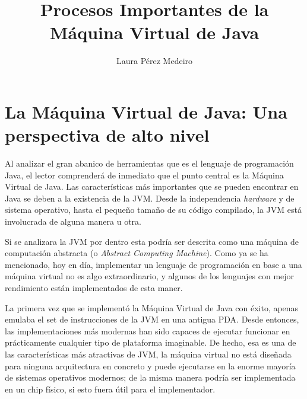 \documentclass[english,runningheads,a4paper]{llncs}[2018/03/10]
\begin{document}
\title{Procesos Importantes de la Máquina Virtual de Java}

\author{Laura Pérez Medeiro}

\maketitle


\section*{La Máquina Virtual de Java: Una perspectiva de alto nivel}
Al analizar el gran abanico de herramientas que es el lenguaje de programación
Java, el lector comprenderá de inmediato que el punto central es la Máquina
Virtual de Java. Las características más importantes que se pueden encontrar en
Java se deben a la existencia de la JVM. Desde la independencia
\textit{hardware} y de sistema operativo, hasta el pequeño tamaño de su código
compilado, la JVM está involucrada de alguna manera u otra.

Si se analizara la JVM por dentro esta podría ser descrita como una máquina de
computación abstracta (o \textit{Abstract Computing Machine}). Como ya se ha
mencionado, hoy en día, implementar un lenguaje de programación en base a una
máquina virtual no es algo extraordinario, y algunos de los lenguajes con mejor
rendimiento están implementados de esta maner.

La primera vez que se implementó la Máquina Virtual de Java con éxito, apenas
emulaba el set de instrucciones de la JVM en una antigua PDA. Desde entonces,
las implementaciones más modernas han sido capaces de ejecutar funcionar en
prácticamente cualquier tipo de plataforma imaginable. De hecho, esa es una de
las características más atractivas de JVM, la máquina virtual no está diseñada
para ninguna arquitectura en concreto y puede ejecutarse en la enorme mayoría de
sistemas operativos modernos; de la misma manera podría ser implementada en un
chip físico, si esto fuera útil para el implementador.
\end{document}
